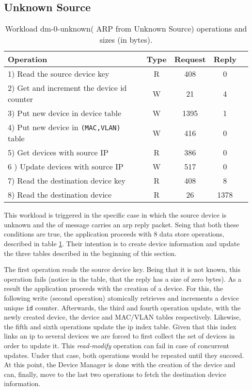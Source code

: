 \documentclass[12pt,openright,twoside]{report}
\begin{document}
\subsection{Unknown Source}
\small
\begin{table}[ht]
\centering 
\begin{tabular}{l c c c c}
Operation & Type & Request & Reply \\ \toprule 
1) Read the source device key & R & 408 & 0\\
2) Get and increment the device id counter & W & 21 & 4\\
3) Put new device in device table & W & 1395 & 1\\
4) Put new device in \texttt{(MAC,VLAN)} table & W & 416 & 0\\
5) Get devices with source IP & R & 386 & 0\\
6 ) Update devices with source IP & W & 517 & 0\\
7) Read the destination device key & R & 408 & 8\\
8) Read the destination device & R & 26 & 1378 \\\bottomrule
\end{tabular}
\caption[Workload dm-0-unknown( ARP from Unknown Source)
operations]{Workload dm-0-unknown( ARP from Unknown Source) operations
  and sizes (in bytes).}
\label{table:ops:dm-0-unknown}
\end{table}


This workload is triggered in the specific case in which  the source device
is unknown and the \gls{of} message carries an \gls{arp} reply 
packet. Seing that both these  conditions are true, the application
proceeds  with 8 data store operations, described in table
\ref{table:ops:dm-0-unknown}. Their intention is to create device
information and update the three tables described  in the beginning
of this section.  

The first operation reads the  source device key. Being
that it is not known, this operation fails (notice in the table, that
the reply has a size  of zero bytes). As a result the application
proceeds with the creation of a device. For this, the
following write (second operation) atomically retrieves
and increments a device unique \texttt{id} counter. Afterwards, the third and fourth  operation
update, with the newly created device, the device and MAC/VLAN
tables respectively. Likewise, the fifth and sixth operations update
the \gls{ip} index table. Given that this index links an \gls{ip} to
several devices we are forced to first collect the set of devices in
order to update it. This \emph{read-modify} operation can
fail in case of concurrent updates. Under that case, both operations
would be repeated until they succeed. At this point, the Device Manager
is done with the creation of the device and can, finally, move to the
last two operations to fetch the destination device information. 
\end{document}
